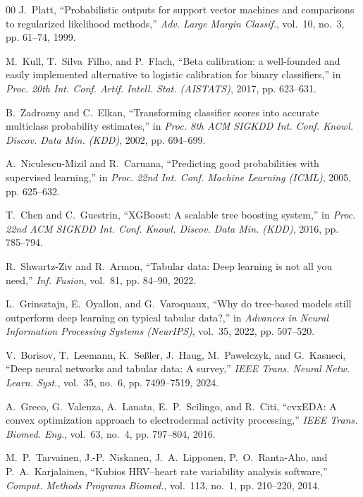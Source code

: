 \documentclass[conference]{IEEEtran}
\begin{document}
\begin{thebibliography}{00}
J.~Platt, ``Probabilistic outputs for support vector machines and comparisons to regularized likelihood methods,'' \textit{Adv. Large Margin Classif.}, vol.~10, no.~3, pp. 61--74, 1999.

M.~Kull, T.~Silva~Filho, and P.~Flach, ``Beta calibration: a well-founded and easily implemented alternative to logistic calibration for binary classifiers,'' in \textit{Proc. 20th Int. Conf. Artif. Intell. Stat. (AISTATS)}, 2017, pp. 623--631.

B.~Zadrozny and C.~Elkan, ``Transforming classifier scores into accurate multiclass probability estimates,'' in \textit{Proc. 8th ACM SIGKDD Int. Conf. Knowl. Discov. Data Min. (KDD)}, 2002, pp. 694--699.

A.~Niculescu-Mizil and R.~Caruana, ``Predicting good probabilities with supervised learning,'' in \textit{Proc. 22nd Int. Conf. Machine Learning (ICML)}, 2005, pp. 625--632.

T.~Chen and C.~Guestrin, ``XGBoost: A scalable tree boosting system,'' in \textit{Proc. 22nd ACM SIGKDD Int. Conf. Knowl. Discov. Data Min. (KDD)}, 2016, pp. 785--794.

R.~Shwartz-Ziv and R.~Armon, ``Tabular data: Deep learning is not all you need,'' \textit{Inf. Fusion}, vol.~81, pp. 84--90, 2022.

L.~Grinsztajn, E.~Oyallon, and G.~Varoquaux, ``Why do tree-based models still outperform deep learning on typical tabular data?,'' in \textit{Advances in Neural Information Processing Systems (NeurIPS)}, vol.~35, 2022, pp. 507--520.

V.~Borisov, T.~Leemann, K.~Se\ss{}ler, J.~Haug, M.~Pawelczyk, and G.~Kasneci, ``Deep neural networks and tabular data: A survey,'' \textit{IEEE Trans. Neural Netw. Learn. Syst.}, vol.~35, no.~6, pp. 7499--7519, 2024.

A.~Greco, G.~Valenza, A.~Lanata, E.~P.~Scilingo, and R.~Citi, ``cvxEDA: A convex optimization approach to electrodermal activity processing,'' \textit{IEEE Trans. Biomed. Eng.}, vol.~63, no.~4, pp. 797--804, 2016.

M.~P.~Tarvainen, J.-P.~Niskanen, J.~A.~Lipponen, P.~O.~Ranta-Aho, and P.~A.~Karjalainen, ``Kubios HRV--heart rate variability analysis software,'' \textit{Comput. Methods Programs Biomed.}, vol.~113, no.~1, pp. 210--220, 2014.
\end{thebibliography}
\end{document}
